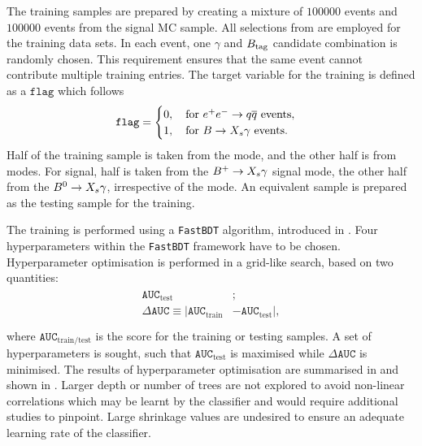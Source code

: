The training samples are prepared by creating a mixture of $100 000$ \epem\ra\qqbar events and $100 000$ \BtoXsgamma events from the signal MC sample.
All selections from  are employed for the training data sets.
In each event, one $\gamma$ and $B_{\mathrm{tag}}$ candidate combination is randomly chosen.
This requirement ensures that the same event cannot contribute multiple training entries.
The target variable for the training is defined as a $\mathtt{flag}$ which follows
\begin{equation}
    \mathtt{flag}=\begin{cases}
      0,\quad \mathrm{for}~\epem\ra\qqbar~\mathrm{events},\\ 
      1,\quad \mathrm{for}~\BtoXsgamma~\mathrm{events}.
      \end{cases}
\end{equation}
Half of the \epem\ra\qqbar training sample is taken from the \feiBp mode, and the other half is from \feiBz modes. 
For signal, half is taken from the $\BptoXsgamma$ signal mode, the other half from the $\BztoXsgamma$, irrespective of the \FEI mode.
An equivalent sample is prepared as the testing sample for the training.

The training is performed using a \texttt{FastBDT} algorithm, introduced in .
Four hyperparameters within the \texttt{FastBDT} framework have to be chosen.
Hyperparameter optimisation is performed in a grid-like search, based on two quantities:
\begin{align}\label{eq:optimisation_criteria}
    \begin{split}
    \mathtt{AUC}_{\mathrm{test}}&;\\
    \Delta \mathtt{AUC} \equiv |\mathtt{AUC}_{\mathrm{train}}& - \mathtt{AUC}_{\mathrm{test}}|,\\
    \end{split}
\end{align}
where $\mathtt{AUC}_{\mathrm{train}/\mathrm{test}}$ is the \AUC score for the training or testing samples.
A set of hyperparameters is sought, such that $ \mathtt{AUC}_{\mathrm{test}}$ is maximised while $\Delta \mathtt{AUC}$ is minimised.
The results of hyperparameter optimisation are summarised in  and shown in .
Larger depth or number of trees are not explored to avoid non-linear correlations which may be learnt by the classifier and would require additional studies to pinpoint.
Large shrinkage values are undesired to ensure an adequate learning rate of the classifier.

